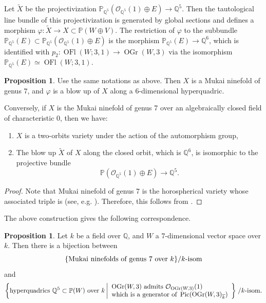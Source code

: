 \documentclass[autodetect-engine, a4paper]{amsart}
\theoremstyle{definition}
\newtheorem{prop}[thm]{Proposition}
\def\P{{\mathbb P}}
\def\Q{{\mathbb Q}}
\def\cO{\mathcal{O}}
\DeclareMathOperator\Pic{\mathrm{Pic}}
\DeclareMathOperator\OGr{\mathrm{OGr}}
\DeclareMathOperator\OFl{\mathrm{OFl}}
\begin{document}
Let $\widetilde X$ be the projectivization $\P_{\Q^5}(\cO_{\Q^5}(1) \oplus E) \to \Q^5$.
Then the tautological line bundle of this projectivization is generated by global sections and defines a morphism $\varphi \colon \widetilde X \to X \subset \P(W \oplus V)$.
The restriction of $\varphi$ to the subbundle $\P_{\Q^5}(E) \subset \P_{\Q^5}(\cO_{\Q^5}(1) \oplus E)$ is the morphism $\P_{\Q^5}(E) \to \Q^6$, which is identified with $p_2 \colon \OFl(W;3,1) \to \OGr(W,3)$ via the isomorphism $\P_{\Q^5}(E) \simeq \OFl(W;3,1)$.

\begin{prop}
Use the same notations as above.
Then $X$ is a Mukai ninefold of genus $7$, and $\varphi$ is a blow up of $X$ along a $6$-dimensional hyperquadric.

 Conversely, if $X$ is the Mukai ninefold of genus 7 over an algebraically closed field of characteristic $0$,
 then we have:
\begin{enumerate}
 \item $X$ is a two-orbits variety under the action of the automorphism group, 
 \item The blow up $\widetilde X$ of $X$  along the closed orbit, which is $\Q^6$, is isomorphic to the projective bundle
 \[
 \P(\cO_{\Q^5}(1) \oplus E) \to \Q^5.
 \]
\end{enumerate}
 \end{prop}

\begin{proof}
Note that Mukai ninefold of genus $7$ is the horospherical variety whose associated triple is \cite[Theorem~0.1~(ii)~2]{Pas09} (see, e.g. \cite[Proposition 1.16]{GPPS02}).
Therefore, this follows from \cite[Subsection 1.4, Subsection 1.5, and Subsection 4.3]{GPPS02}.
\end{proof}

The above construction gives the following correspondence.

\begin{prop}
\label{prop:Mukaininequadic}
Let $k$ be a field over $\Q$, and $W$ a $7$-dimensional vector space over $k$.
Then there is a bijection between 
\[
\{\textup{Mukai ninefolds of genus $7$ over }k \}/k\textup{-isom}
\]
and
\[
\left\{
\textup{hyperquadrics } \Q^5 \subset \P (W) \textup{ over $k$} \left|
\begin{array}{l}
\OGr(W,3) \textup{ admits } \cO_{\OGr(W,3)}(1) \\
\textup{which is a generator of } \Pic (\OGr(W,3)_{\overline{k}})
\end{array}
\right\}\right./k\textup{-isom}.
\]
\end{prop}
\end{document}
